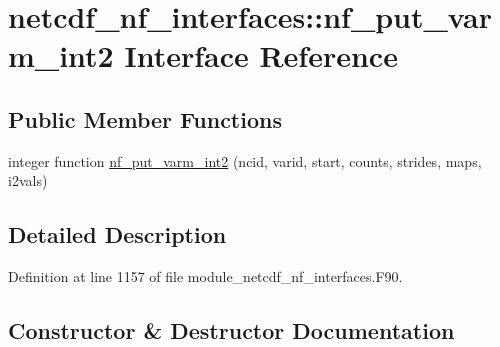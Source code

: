 \hypertarget{interfacenetcdf__nf__interfaces_1_1nf__put__varm__int2}{}\section{netcdf\+\_\+nf\+\_\+interfaces\+:\+:nf\+\_\+put\+\_\+varm\+\_\+int2 Interface Reference}
\label{interfacenetcdf__nf__interfaces_1_1nf__put__varm__int2}
\subsection*{Public Member Functions}
\begin{DoxyCompactItemize}
\item 
integer function \hyperlink{interfacenetcdf__nf__interfaces_1_1nf__put__varm__int2_af4ba00c0bb97db553915cd74b3f87333}{nf\+\_\+put\+\_\+varm\+\_\+int2} (ncid, varid, start, counts, strides, maps, i2vals)
\end{DoxyCompactItemize}


\subsection{Detailed Description}


Definition at line 1157 of file module\+\_\+netcdf\+\_\+nf\+\_\+interfaces.\+F90.



\subsection{Constructor \& Destructor Documentation}
\mbox{\label{interfacenetcdf__nf__interfaces_1_1nf__put__varm__int2_af4ba00c0bb97db553915cd74b3f87333}} 
